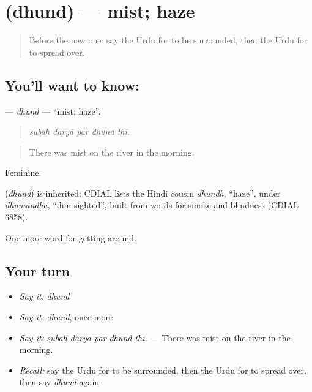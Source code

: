 \section[\texorpdfstring{\ur{دھند} (dhund)}{دھند (dhund)}]{ (dhund) — mist; haze}

\label{lesson:UR-C431-dhund}



\begin{quote}
Before the new one: say the Urdu for to be surrounded, then the Urdu for to spread over.
\end{quote}

\subsection*{You'll want to know: }
\textbf{} — \emph{dhund} — \textquotedblleft{}mist; haze\textquotedblright{}.

\begin{quote}
    
\end{quote}

\begin{quote}
\emph{subah daryā par dhund thī.}
\end{quote}

\begin{quote}
There was mist on the river in the morning.
\end{quote}

Feminine.

\begin{cousinweb}
\textbf{} (\emph{dhund}) is inherited: CDIAL lists the Hindi cousin \emph{dhundh}, \textquotedblleft{}haze\textquotedblright{}, under \emph{dhūmāndha}, \textquotedblleft{}dim-sighted\textquotedblright{}, built from words for smoke and blindness (CDIAL 6858).
\end{cousinweb}

\begin{grammarlens}[title={What you've built}]
One more word for getting around.
\end{grammarlens}

\subsection*{Your turn}
\begin{itemize}
\raggedright
  \item \emph{Say it:} \emph{dhund}
  \item \emph{Say it:} \emph{dhund}, once more
  \item \emph{Say it:} \emph{subah daryā par dhund thī.} — There was mist on the river in the morning.
  \item \emph{Recall:} say the Urdu for to be surrounded, then the Urdu for to spread over, then say \emph{dhund} again
\end{itemize}

